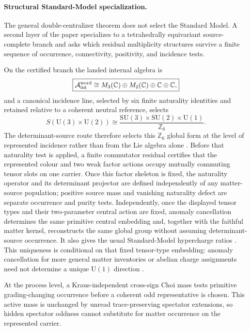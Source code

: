 \documentclass[11pt]{article}
\numberwithin{equation}{section}
\theoremstyle{definition}
\theoremstyle{remark}
\newcommand{\Z}{\mathbb Z}
\newcommand{\C}{\mathbb C}
\newcommand{\U}{\mathrm U}
\newcommand{\SU}{\mathrm{SU}}
\newcommand{\A}{\mathcal A}
\begin{document}
\paragraph{Structural Standard-Model specialization.}

The general double-centralizer theorem does not select the Standard Model.
A second layer of the paper specializes to a tetrahedrally equivariant
source-complete branch and asks which residual multiplicity structures survive
a finite sequence of occurrence, connectivity, positivity, and incidence
tests.

On the certified branch the landed internal algebra is
\begin{equation}
\boxed{
\A_{\rm int}^{\rm word}
\cong
M_3(\C)\oplus M_2(\C)\oplus\C\oplus\C,}
\label{eq:intro-internal-algebra}
\end{equation}
and a canonical incidence line, selected by six finite naturality identities
and retained relative to a coherent neutral reference, selects
\begin{equation}
\boxed{
S(\U(3)\times\U(2))
\cong
\frac{\SU(3)\times\SU(2)\times\U(1)}{\Z_6}.}
\label{eq:intro-gauge-group}
\end{equation}
The determinant-source route therefore selects this $\Z_6$ global form at
the level of represented incidence rather than from the Lie algebra alone
\cite{Hucks1991,Tong2017}.  Before that naturality test is applied, a finite
commutator residual certifies that the represented colour and two weak factor
actions occupy mutually commuting tensor slots on one carrier.  Once this
factor skeleton is fixed, the naturality operator and its determinant projector
are defined independently of any matter-source population; positive source mass
and vanishing naturality defect are separate occurrence and purity tests.
Independently, once the displayed tensor types and their two-parameter central
action are fixed, anomaly cancellation determines the same primitive central
embedding and, together with the faithful matter kernel, reconstructs the same
global group without assuming determinant-source occurrence.  It also gives
the usual Standard-Model hypercharge ratios
\cite{GengMarshak1989,MinahanRamondWarner1990,
AlvarezGraciaBondiaMartin1995}.  This uniqueness is conditional on that fixed
tensor-type embedding: anomaly cancellation for more general matter
inventories or abelian charge assignments need not determine a unique
$\U(1)$ direction \cite{GripaiosNguyen2026}.

At the process level, a Kraus-independent cross-sign Choi mass tests primitive
grading-changing occurrence before a coherent odd representative is chosen.
This active mass is unchanged by unread trace-preserving spectator extensions,
so hidden spectator oddness cannot substitute for matter occurrence on the
represented carrier.
\end{document}
